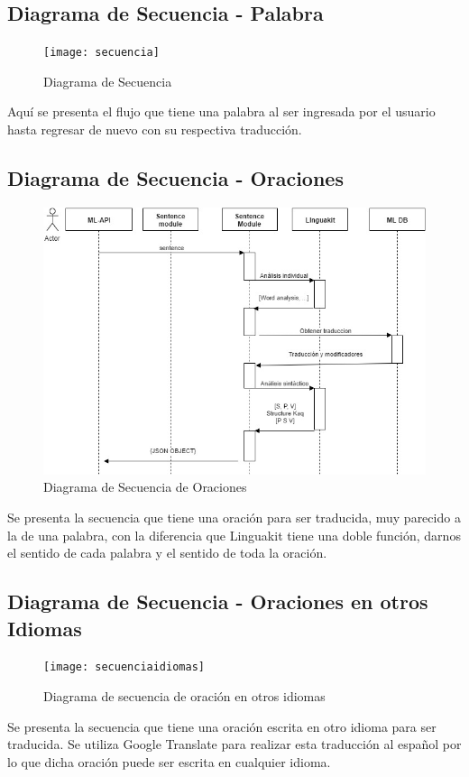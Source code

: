 \documentclass[a4paper,openright,11pt]{article}
\begin{document}
\subsection{Diagrama de Secuencia - Palabra}
\begin{figure}[h]
	\centering
	\texttt{[image: secuencia]}
	\caption{Diagrama de Secuencia}
	\label{fig:sec}
\end{figure}
Aquí se presenta el flujo que tiene una palabra al ser ingresada por el usuario hasta regresar de nuevo con su respectiva traducción.

\subsection{Diagrama de Secuencia - Oraciones}
\begin{figure}[H]
	\centering
	\includegraphics[width=1.1\textwidth]{secuenciaoracion}
	\caption{Diagrama de Secuencia de Oraciones}
	\label{fig:seco}
\end{figure}
Se presenta la secuencia que tiene una oración para ser traducida, muy parecido a la de una palabra, con la diferencia que Linguakit tiene una doble función, darnos el sentido de cada palabra y el sentido de toda la oración.

\subsection{Diagrama de Secuencia - Oraciones en otros Idiomas}
\begin{figure}[H]
	\centering
	\texttt{[image: secuenciaidiomas]}
	\caption{Diagrama de secuencia de oración en otros idiomas}
	\label{fig:seci}
\end{figure}
Se presenta la secuencia que tiene una oración escrita en otro idioma para ser traducida. Se utiliza Google Translate para realizar esta traducción al español por lo que dicha oración puede ser escrita en cualquier idioma.
\end{document}
